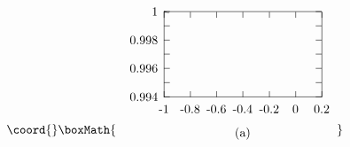 \documentclass[a4paper,a4paper]{article}
\begin{document}
\begin{figure}[tbh]
\[\coord{}\boxMath{
\setlength{\unitlength}{0.240900pt} \ifx\plotpoint\undefined%
\newsavebox{\plotpoint}\fi
\begin{picture}(740,450)(0,0)
\font\gnuplot=cmr10 at 10pt
\gnuplot
\sbox{\plotpoint}{\rule[-0.200pt]{0.400pt}{0.400pt}}%
\put(160.0,123.0){\rule[-0.200pt]{4.818pt}{0.400pt}}
\put(140,123){\makebox(0,0)[r]{0.994}}
\put(669.0,123.0){\rule[-0.200pt]{4.818pt}{0.400pt}}
\put(160.0,171.0){\rule[-0.200pt]{4.818pt}{0.400pt}}
\put(669.0,171.0){\rule[-0.200pt]{4.818pt}{0.400pt}}
\put(160.0,219.0){\rule[-0.200pt]{4.818pt}{0.400pt}}
\put(140,219){\makebox(0,0)[r]{0.996}}
\put(669.0,219.0){\rule[-0.200pt]{4.818pt}{0.400pt}}
\put(160.0,267.0){\rule[-0.200pt]{4.818pt}{0.400pt}}
\put(669.0,267.0){\rule[-0.200pt]{4.818pt}{0.400pt}}
\put(160.0,314.0){\rule[-0.200pt]{4.818pt}{0.400pt}}
\put(140,314){\makebox(0,0)[r]{0.998}}
\put(669.0,314.0){\rule[-0.200pt]{4.818pt}{0.400pt}}
\put(160.0,362.0){\rule[-0.200pt]{4.818pt}{0.400pt}}
\put(669.0,362.0){\rule[-0.200pt]{4.818pt}{0.400pt}}
\put(160.0,410.0){\rule[-0.200pt]{4.818pt}{0.400pt}}
\put(140,410){\makebox(0,0)[r]{1}}
\put(669.0,410.0){\rule[-0.200pt]{4.818pt}{0.400pt}}
\put(160.0,123.0){\rule[-0.200pt]{0.400pt}{4.818pt}}
\put(160,82){\makebox(0,0){-1}}
\put(160.0,390.0){\rule[-0.200pt]{0.400pt}{4.818pt}}
\put(248.0,123.0){\rule[-0.200pt]{0.400pt}{4.818pt}}
\put(248,82){\makebox(0,0){-0.8}}
\put(248.0,390.0){\rule[-0.200pt]{0.400pt}{4.818pt}}
\put(336.0,123.0){\rule[-0.200pt]{0.400pt}{4.818pt}}
\put(336,82){\makebox(0,0){-0.6}}
\put(336.0,390.0){\rule[-0.200pt]{0.400pt}{4.818pt}}
\put(424.0,123.0){\rule[-0.200pt]{0.400pt}{4.818pt}}
\put(424,82){\makebox(0,0){-0.4}}
\put(424.0,390.0){\rule[-0.200pt]{0.400pt}{4.818pt}}
\put(513.0,123.0){\rule[-0.200pt]{0.400pt}{4.818pt}}
\put(513,82){\makebox(0,0){-0.2}}
\put(513.0,390.0){\rule[-0.200pt]{0.400pt}{4.818pt}}
\put(601.0,123.0){\rule[-0.200pt]{0.400pt}{4.818pt}}
\put(601,82){\makebox(0,0){0}}
\put(601.0,390.0){\rule[-0.200pt]{0.400pt}{4.818pt}}
\put(689.0,123.0){\rule[-0.200pt]{0.400pt}{4.818pt}}
\put(689,82){\makebox(0,0){0.2}}
\put(689.0,390.0){\rule[-0.200pt]{0.400pt}{4.818pt}}
\put(160.0,123.0){\rule[-0.200pt]{127.436pt}{0.400pt}}
\put(689.0,123.0){\rule[-0.200pt]{0.400pt}{69.138pt}}
\put(160.0,410.0){\rule[-0.200pt]{127.436pt}{0.400pt}}
\put(424,0){\makebox(0,0){(a)}}
\put(160.0,123.0){\rule[-0.200pt]{0.400pt}{69.138pt}}
\put(160,410){\usebox{\plotpoint}}
\put(160,408.17){\rule{1.900pt}{0.400pt}}
\multiput(160.00,409.17)(5.056,-2.000){2}{\rule{0.950pt}{0.400pt}}
\multiput(169.00,406.94)(1.212,-0.468){5}{\rule{1.000pt}{0.113pt}}

\end{picture}}\]
\end{figure}
\end{document}
